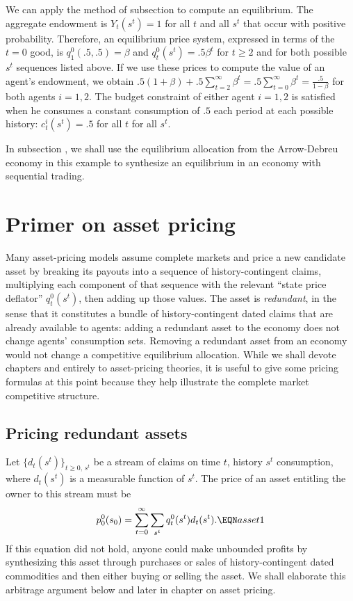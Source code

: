 We can apply the method of subsection  to compute an equilibrium.  The aggregate endowment is $Y_t(s^t)=1$
for all $t$ and all $s^t$ that occur with positive probability.  Therefore, an equilibrium price system, expressed in terms of 
the $t=0$ good, is $q^0_1(.5, .5)= \beta$ and 
$q_t^0 (s^t) = .5 \beta^t$ for $t \geq 2$ and for both 
possible $s^t$ sequences listed above.
If we use these prices to compute the value of an agent's endowment, we obtain $.5 (1 + \beta) +.5 
\sum_{t=2}^\infty \beta^t = .5 \sum_{t=0}^\infty \beta^t 
 = {\frac{.5}{1-\beta}}$ for both agents $i=1,2$.
The budget constraint of either agent $i=1,2$ is 
satisfied when he consumes a constant
consumption of $.5$ each period at  each possible history: $c_t^i(s^t) = .5$ for all $t$ for all $s^t$.

In subsection , we shall use the equilibrium allocation from the Arrow-Debreu economy in this example
to synthesize an equilibrium in an economy with sequential trading.




\section{Primer on asset pricing}
Many asset-pricing models       assume complete markets and price
a  new  candidate asset by breaking its payouts  into a sequence of history-contingent
claims, multiplying each  component of that sequence with the
relevant ``state price deflator'' $q_t^0(s^t)$, then adding up
those values. The  asset is  {\it redundant\/}, in the
sense that it constitutes  a bundle of history-contingent dated claims that are already available to agents: 
adding a redundant  asset to 
the economy does not change  agents'  consumption sets.  Removing a redundant
asset from an  economy would  not change a competitive equilibrium allocation. 
While we shall devote chapters  and  entirely  to
asset-pricing theories, it is useful to give some pricing formulas
at this  point because they help illustrate  the complete market
competitive structure.


\subsection{Pricing redundant assets}
  Let $\{d_t(s^t)\}_{t\geq 0,\,s^t}$ be a stream of claims
on time $t$, history $s^t$ consumption, where $d_t(s^t)$ is a measurable
function of $s^t$.  The price of   an asset entitling
the owner to this stream
must be
$$ p^0_0(s_0)  = \sum_{t=0}^\infty  \sum_{s^t} q_t^0(s^t) d_t(s^t) . \EQN asset1
$$
If this equation did not hold, anyone could make unbounded profits
by synthesizing this asset  through
purchases or sales  of  history-contingent dated commodities
and then either buying or selling the asset.
We shall elaborate  this arbitrage argument
below and later in  chapter  on asset pricing.




